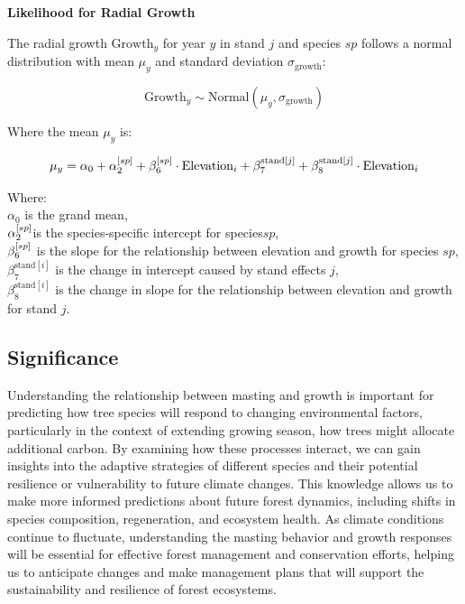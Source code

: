 \documentclass[11pt,letter]{article}
\begin{document}
\textbf{Likelihood for Radial Growth}

The radial growth \(\text{Growth}_y\) for year \(y\) in stand \(j\) and species \(sp\) follows a normal distribution with mean \(\mu_y\) and standard deviation \(\sigma_{\text{growth}}\):

\[
\text{Growth}_y \sim \text{Normal}(\mu_y, \sigma_{\text{growth}})
\]

Where the mean \(\mu_y\) is:

\[
\mu_y =\alpha_0 + \alpha_2^{\text[sp]} + \beta_6^{\text[sp]} \cdot \text{Elevation}_i + \beta_7^{\text{stand}[j]} + \beta_8^{\text{stand}[j]} \cdot \text{Elevation}_i
\]

Where:\\
\(\alpha_0\) is the grand mean,\\
\(\alpha_2^{\text[sp]}\)is the species-specific intercept for species\(sp\),\\
\(\beta_6^{\text[sp]}\) is the slope for the relationship between elevation and growth for species \(sp\),\\
\(\beta_7^{\text{stand}[i]}\) is the change in intercept caused by stand effects \(j\),\\
\(\beta_8^{\text{stand}[i]}\) is the change in slope for the relationship between elevation and growth for stand \(j\).


\subsection{Significance}
Understanding the relationship between masting and growth is important for predicting how tree species will respond to changing environmental factors, particularly in the context of extending growing season, how trees might allocate additional carbon. By examining how these processes interact, we can gain insights into the adaptive strategies of different species and their potential resilience or vulnerability to future climate changes. This knowledge allows us to make more informed predictions about future forest dynamics, including shifts in species composition, regeneration, and ecosystem health. As climate conditions continue to fluctuate, understanding the  masting behavior and growth responses will be essential for effective forest management and conservation efforts, helping us to anticipate changes and make management plans that will support the sustainability and resilience of forest ecosystems.\par
\end{document}
